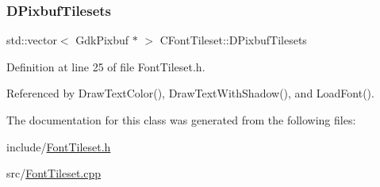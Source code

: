\subsubsection{\texorpdfstring{D\+Pixbuf\+Tilesets}{DPixbufTilesets}}
{\footnotesize\ttfamily std\+::vector$<$ Gdk\+Pixbuf $\ast$ $>$ C\+Font\+Tileset\+::\+D\+Pixbuf\+Tilesets\hspace{0.3cm}{\ttfamily [protected]}}



Definition at line 25 of file Font\+Tileset.\+h.



Referenced by Draw\+Text\+Color(), Draw\+Text\+With\+Shadow(), and Load\+Font().



The documentation for this class was generated from the following files\+:\begin{DoxyCompactItemize}
\item 
include/\hyperlink{FontTileset_8h}{Font\+Tileset.\+h}\item 
src/\hyperlink{FontTileset_8cpp}{Font\+Tileset.\+cpp}\end{DoxyCompactItemize}
